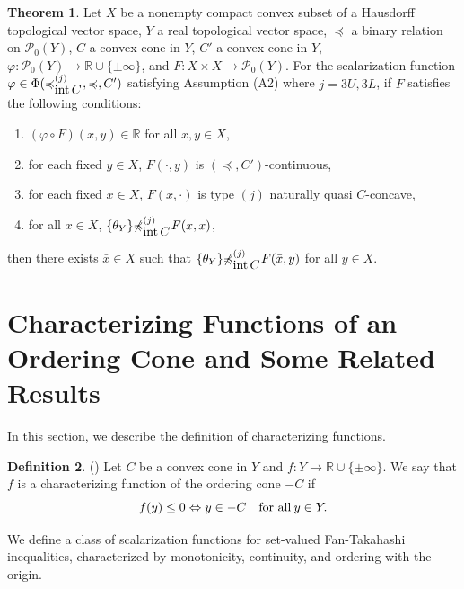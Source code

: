 \documentclass[a4paper,11pt]{jsarticle}
\theoremstyle{definition}
\newtheorem{dfn}{Definition}[section]
\newtheorem{thm}[dfn]{Theorem}
\newcommand{\rnum}{\mathbb{R}}
\newcommand{\Interior}[1]{\mbox{\rm int}\mbox{$\,#1$}}
\newcommand{\pow}[1]{\mathcal{P}_{0}(#1)}
\newcommand{\setrel}[2]{\preccurlyeq^{(#1)}_{#2}\!}
\newcommand{\notsetrel}[2]{{\not\preccurlyeq}^{(#1)}_{#2}\!}
\begin{document}
\begin{thm}\label{NewSetValuedFanTakahashiMinimaxInequalitiesType2}
  Let $X$ be a nonempty compact convex subset of a Hausdorff topological vector space,
  $Y$ a real topological vector space, $\preccurlyeq$ a binary relation on $\pow{Y}$,
  $C$ a convex cone in $Y$, $C'$ a convex cone in $Y$,
  $\varphi\colon \pow{Y} \to \rnum \cup \{\pm \infty\}$,
  and $F\colon X \times X \to \pow{Y}$.
  For the scalarization function $\varphi \in \Phi(\setrel{j}{\Interior{C}}\:, \preccurlyeq, C')$
  satisfying Assumption (A2) where $j= 3U, 3L$,
  if $F$ satisfies the following conditions:
  \begin{enumerate}
    \item $(\varphi \circ F)(x,y) \in \rnum$ for all $x,y \in X$,
    \item for each fixed $y \in X$, $F(\cdot,y)$ is $(\preccurlyeq, C')$-continuous,
    \item for each fixed $x \in X$, $F(x,\cdot)$ is type $(j)$ naturally quasi $C$-concave,
    \item for all $x \in X$, $\{\theta_Y\} \notsetrel{j}{\Interior{C}}\: F(x,x) $,
  \end{enumerate}
  then there exists $\bar{x} \in X$ such that $\{\theta_Y\} \notsetrel{j}{\Interior{C}}\: F(\bar{x},y)$
  for all $y \in X$.
\end{thm}

\section{\rm Characterizing Functions of an Ordering Cone and Some Related Results}

In this section, we describe the definition of characterizing functions.

\begin{dfn}{(\cite{HuqTanaka2025})}
  Let $C$ be a convex cone in $Y$ and $f: Y \to \rnum \cup \{\pm \infty\}$.
  We say that $f$ is a characterizing function of the ordering cone $-C$ if
  \begin{equation}
    f(y) \leq 0 \Leftrightarrow y \in -C \quad \text{for all}\: y \in Y. \notag
  \end{equation}
\end{dfn}

We define a class of scalarization functions for set-valued
Fan-Takahashi inequalities, characterized by
monotonicity, continuity, and ordering with the origin.
\end{document}
